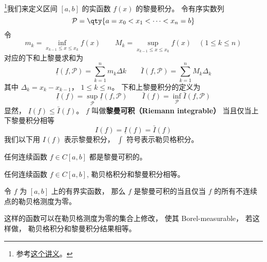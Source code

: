 
\begin{issues}
\issueDraft
\issueMissDepend
\end{issues}

\footnote{参考\href{https://math.berkeley.edu/~arveson/Dvi/105/note1.pdf}{这个讲义}。}我们来定义区间 $[a, b]$ 的实函数 $f(x)$ 的黎曼积分。 令有序实数列
\begin{equation}
\mathcal P = \qty{a = x_0 < x_1 < \dots < x_n = b}
\end{equation}
令
\begin{equation}
m_k = \inf_{x_{k-1} \le x \le x_k} f(x) \qquad M_k = \sup_{x_{k-1} \le x \le x_k} f(x) \quad (1 \le k \le n)
\end{equation}
对应的下和上黎曼求和为
\begin{equation}
\underline I(f, \mathcal P) = \sum_{k = 1}^n m_k\Delta k \qquad \bar I(f, \mathcal P) = \sum_{k = 1}^n M_k \Delta_k
\end{equation}
其中 $\Delta_k = x_k - x_{k-1}$， $1\le k\le n$。 下和上黎曼积分的定义为
\begin{equation}
\underline I(f) = \sup_{\mathcal P} \underline I(f, \mathcal P) \qquad \bar I(f) = \inf_{\mathcal P} \bar I(f, \mathcal P)
\end{equation}
显然， $\underline I(f) \le \bar I(f)$。 $f$ 叫做\textbf{黎曼可积（Riemann integrable）} 当且仅当上下黎曼积分相等
\begin{equation}
I(f) = \underline I(f) = \bar I(f)
\end{equation}
我们以下用 $I(f)$ 表示黎曼积分， $\int$ 符号表示勒贝格积分。

\begin{theorem}{}
任何连续函数 $f \in C[a, b]$ 都是黎曼可积的。
\end{theorem}

\begin{theorem}{}
任何连续函数 $f \in C[a, b]$, 勒贝格积分和黎曼积分相等。
\end{theorem}

\begin{theorem}{}
令 $f$ 为 $[a, b]$ 上的有界实函数， 那么 $f$ 是黎曼可积的当且仅当 $f$ 的所有不连续点的勒贝格测度为零。
\end{theorem}

这样的函数可以在勒贝格测度为零的集合上修改， 使其 Borel-measurable， 若这样做， 勒贝格积分和黎曼积分结果相等。

